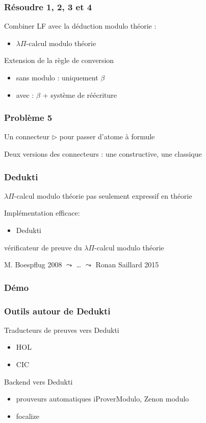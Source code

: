 \documentclass[12pt,aspectratio=169]{beamer}
\begin{document}
\begin{frame}
  \frametitle{Résoudre 1, 2, 3 et 4}
  Combiner LF avec la déduction modulo théorie :
  \begin{itemize}
  \item $\lambda\Pi$-calcul modulo théorie
  \end{itemize}
  \bigskip
  
  Extension de la règle de conversion 
  \begin{itemize}
  \item sans modulo : uniquement $\beta$
  \item avec : $\beta$ + système de réécriture 
  \end{itemize}
\end{frame}

\begin{frame}
  \frametitle{Problème 5}
  Un connecteur $\triangleright$ pour passer d'atome à formule
  \medskip
  
  Deux versions des connecteurs : une constructive, une classique
\end{frame}

\begin{frame}
  \frametitle{Dedukti}
  $\lambda\Pi$-calcul modulo théorie pas seulement expressif en théorie
  \medskip

  Implémentation efficace:
  \begin{itemize}
  \item Dedukti
  \end{itemize}
  vérificateur de preuve du $\lambda\Pi$-calcul modulo théorie
  \bigskip

  M. Boespflug 2008 $\leadsto$ \dots{} $\leadsto$ Ronan Saillard 2015
  
\end{frame}

\begin{frame}
  \frametitle{Démo}
  
\end{frame}

\begin{frame}
  \frametitle{Outils autour de Dedukti}

  Traducteurs de preuves vers Dedukti
  \begin{itemize}
  \item HOL
  \item CIC
  \end{itemize}
  \bigskip
  
  Backend vers Dedukti
  \begin{itemize}
  \item prouveurs automatiques iProverModulo, Zenon modulo
  \item focalize
  \end{itemize}
\end{frame}
\end{document}
